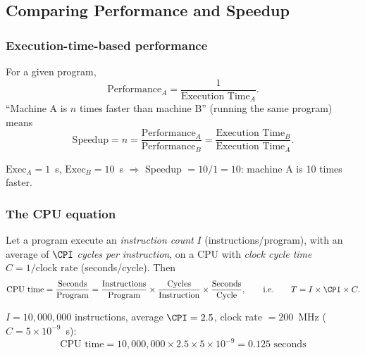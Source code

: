 \subsection{Comparing Performance and Speedup}

\subsubsection{Execution-time-based performance}
\begin{definition}
For a given program,
\[
  \text{Performance}_A = \frac{1}{\text{Execution Time}_A}.
\]
``Machine A is $n$ times faster than machine B'' (running the same program)
means
\[
  \text{Speedup} = n = \frac{\text{Performance}_A}{\text{Performance}_B} =
  \frac{\text{Execution Time}_B}{\text{Execution Time}_A}.
\]
\end{definition}
\begin{eg}
$\text{Exec}_A = 1$~s, $\text{Exec}_B = 10$~s $\Rightarrow$ Speedup $= 10/1 =
10$: machine A is 10 times faster.
\end{eg}

\subsubsection{The CPU equation}
\begin{theorem}
Let a program execute an \emph{instruction count} $I$ (instructions/program),
with an average of $\CPI$ \emph{cycles per instruction}, on a CPU with
\emph{clock cycle time} $C = 1/\text{clock rate}$ (seconds/cycle). Then
\[
  \text{CPU time} = \frac{\text{Seconds}}{\text{Program}} =
  \frac{\text{Instructions}}{\text{Program}} \times
  \frac{\text{Cycles}}{\text{Instruction}} \times
  \frac{\text{Seconds}}{\text{Cycle}},
  \qquad\text{i.e.}\qquad T = I \times \CPI \times C .
\]
\end{theorem}

\begin{eg}
$I = 10{,}000{,}000$ instructions, average $\CPI =2.5$, clock rate
$=200$~MHz ($C = 5\times10^{-9}$~s):
\[
  \text{CPU time} = 10{,}000{,}000 \times 2.5 \times 5\times10^{-9} = 0.125
  \text{ seconds}
\]
\end{eg}

